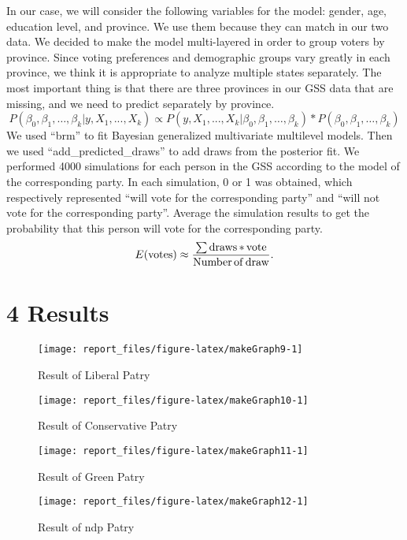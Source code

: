 \documentclass[
  12pt,
]{article}
\begin{document}
In our case, we will consider the following variables for the model:
gender, age, education level, and province. We use them because they can
match in our two data. We decided to make the model multi-layered in
order to group voters by province. Since voting preferences and
demographic groups vary greatly in each province, we think it is
appropriate to analyze multiple states separately. The most important
thing is that there are three provinces in our GSS data that are
missing, and we need to predict separately by province.
\[P(\beta_0, \beta_1, …, \beta_k| y, X_1,...,X_k) \propto P(y, X_1,...,X_k|\beta_0, \beta_1, …, \beta_k) * P(\beta_0, \beta_1, …, \beta_k)\]
We used ``brm'' to fit Bayesian generalized multivariate multilevel
models. Then we used ``add\_predicted\_draws'' to add draws from the
posterior fit. We performed 4000 simulations for each person in the GSS
according to the model of the corresponding party. In each simulation, 0
or 1 was obtained, which respectively represented ``will vote for the
corresponding party'' and ``will not vote for the corresponding party''.
Average the simulation results to get the probability that this person
will vote for the corresponding party.
\[E({\rm votes}) \approx \frac{{\sum} \, {\rm draws}\,{*}\,{\rm vote}} {{\rm Number} \, {\rm of} \, {\rm draw}}.\]

\hypertarget{results}{%
\section{4 Results}\label{results}}

\begin{figure}
\texttt{[image: report\_files/figure-latex/makeGraph9-1]} \caption{Result of Liberal Patry}\label{fig:makeGraph9}
\end{figure}

\begin{figure}
\texttt{[image: report\_files/figure-latex/makeGraph10-1]} \caption{Result of Conservative Patry}\label{fig:makeGraph10}
\end{figure}

\begin{figure}
\texttt{[image: report\_files/figure-latex/makeGraph11-1]} \caption{Result of Green Patry}\label{fig:makeGraph11}
\end{figure}

\begin{figure}
\texttt{[image: report\_files/figure-latex/makeGraph12-1]} \caption{Result of ndp Patry}\label{fig:makeGraph12}
\end{figure}
\end{document}
